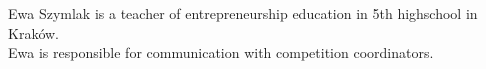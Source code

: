 \documentclass[class=report, crop=false]{standalone}
\begin{document}
Ewa Szymlak is a teacher of entrepreneurship education in 5th highschool in Kraków. \\
Ewa is responsible for communication with competition coordinators.
\end{document}
